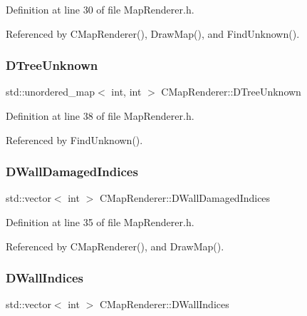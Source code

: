 Definition at line 30 of file Map\+Renderer.\+h.



Referenced by C\+Map\+Renderer(), Draw\+Map(), and Find\+Unknown().

\hypertarget{classCMapRenderer_a55024ab05d176fcc6b60031aef47e1c8}{}\label{classCMapRenderer_a55024ab05d176fcc6b60031aef47e1c8} 
\subsubsection{\texorpdfstring{D\+Tree\+Unknown}{DTreeUnknown}}
{\footnotesize\ttfamily std\+::unordered\+\_\+map$<$ int, int $>$ C\+Map\+Renderer\+::\+D\+Tree\+Unknown\hspace{0.3cm}{\ttfamily [protected]}}



Definition at line 38 of file Map\+Renderer.\+h.



Referenced by Find\+Unknown().

\hypertarget{classCMapRenderer_a032989788e978e11147ab8603d875771}{}\label{classCMapRenderer_a032989788e978e11147ab8603d875771} 
\subsubsection{\texorpdfstring{D\+Wall\+Damaged\+Indices}{DWallDamagedIndices}}
{\footnotesize\ttfamily std\+::vector$<$ int $>$ C\+Map\+Renderer\+::\+D\+Wall\+Damaged\+Indices\hspace{0.3cm}{\ttfamily [protected]}}



Definition at line 35 of file Map\+Renderer.\+h.



Referenced by C\+Map\+Renderer(), and Draw\+Map().

\hypertarget{classCMapRenderer_a5ba880d6fb399fc678321cb1daa2e856}{}\label{classCMapRenderer_a5ba880d6fb399fc678321cb1daa2e856} 
\subsubsection{\texorpdfstring{D\+Wall\+Indices}{DWallIndices}}
{\footnotesize\ttfamily std\+::vector$<$ int $>$ C\+Map\+Renderer\+::\+D\+Wall\+Indices\hspace{0.3cm}{\ttfamily [protected]}}



